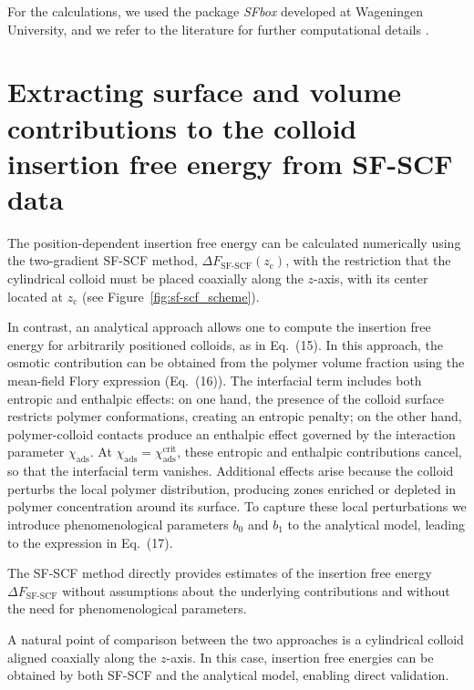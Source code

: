 \documentclass[10pt, a4paper, twocolumn]{article}
\begin{document}
For the calculations, we used the package \emph{SFbox} developed at Wageningen University, and we refer to the literature for further computational details \cite{Evers1990b}.


\pagebreak
\section{Extracting surface and volume contributions to the colloid insertion free energy from SF-SCF data}

The position-dependent insertion free energy can be calculated numerically using the two-gradient SF-SCF method, $\Delta F_{\text{SF-SCF}}(z_{\text{c}})$, with the restriction that the cylindrical colloid must be placed coaxially along the $z$-axis, with its center located at $z_{\text{c}}$ (see Figure~\ref{fig:sf-scf_scheme}).

In contrast, an analytical approach allows one to compute the insertion free energy for arbitrarily positioned colloids, as in Eq.~(15).
In this approach, the osmotic contribution can be obtained from the polymer volume fraction using the mean-field Flory expression (Eq.~(16)).
The interfacial term includes both entropic and enthalpic effects: 
on one hand, the presence of the colloid surface restricts polymer conformations, creating an entropic penalty; 
on the other hand, polymer-colloid contacts produce an enthalpic effect governed by the interaction parameter $\chi_{\text{ads}}$.
At $\chi_{\text{ads}} = \chi_{\text{ads}}^{\text{crit}}$, these entropic and enthalpic contributions cancel, so that the interfacial term vanishes.
Additional effects arise because the colloid perturbs the local polymer distribution, producing zones enriched or depleted in polymer concentration around its surface.
To capture these local perturbations we introduce phenomenological parameters $b_0$ and $b_1$ to the analytical model, leading to the expression in Eq.~(17).

The SF-SCF method directly provides estimates of the insertion free energy $\Delta F_{\text{SF-SCF}}$ without assumptions about the underlying contributions and without the need for phenomenological parameters.

A natural point of comparison between the two approaches is a cylindrical colloid aligned coaxially along the $z$-axis.
In this case, insertion free energies can be obtained by both SF-SCF and the analytical model, enabling direct validation.
\end{document}
